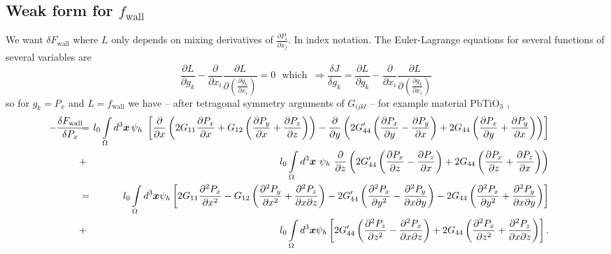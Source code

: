 \documentclass[16pt]{article} %
\begin{document}
\subsection{Weak form for $f_\mathrm{wall}$}
%
We want $\delta F_\mathrm{wall}$ where $L$ only depends on mixing derivatives of $\frac{\partial P_i}{\partial x_j}$.
%
In index notation. The Euler-Lagrange equations for several functions of several variables are
%
$$\frac{\partial L}{\partial g_{k}} - \frac{\partial}{\partial x_i}\frac{\partial L}{\partial \left( \frac{\partial g_k}{\partial x_i}\right)} = 0 \,\,\,\,\mathrm{which}\,\,\, \Rightarrow \frac{\delta J}{\delta g_k} = \frac{\partial L}{\partial g_{k}} - \frac{\partial}{\partial x_i}\frac{\partial L}{\partial \left( \frac{\partial g_k}{\partial x_i}\right)}  $$
%
so for $g_k = P_x$ and $L = f_\mathrm{wall}$ we have -- after tetragonal symmetry arguments of $G_{ijkl}$ -- for example material $\mathrm{PbTiO}_3$ \cite{Li2001}, 
%
\begin{eqnarray}\nonumber
\hspace{-15pt} -\frac{\delta F_\mathrm{wall}}{\delta P_x}\hspace{-5pt} &=&\hspace{-6pt} l_0 \int\limits_\Omega d^3 {\boldsymbol x} \,\psi_h \,\,\left[ \frac{\partial}{\partial x} \left(2 G_{11} \frac{\partial P_x}{\partial x} + G_{12} \left(\frac{\partial P_y}{\partial x} + \frac{\partial P_z}{\partial z} \right) \right) - \frac{\partial}{\partial y} \left(2 G_{44}' \left(\frac{\partial P_x}{\partial y} - \frac{\partial P_y}{\partial x} \right) + 2 G_{44} \left(\frac{\partial P_x}{\partial y} + \frac{\partial P_y}{\partial x} \right) \right) \right]\\ \nonumber
& +& l_0\int\limits_\Omega d^3 {\boldsymbol x} \,\, \psi_h \,\, \frac{\partial}{\partial z} \left( 2 G_{44}' \left(\frac{\partial P_x}{\partial z} - \frac{\partial P_z}{\partial x} \right) + 2 G_{44} \left(\frac{\partial P_x}{\partial z} + \frac{\partial P_z}{\partial x} \right)\right) \\ \nonumber
&=&\hspace{-8pt}  l_0 \int\limits_\Omega d^3 {\boldsymbol x} \psi_h \left[ 2 G_{11} \frac{\partial^2 P_x}{\partial x^2} - G_{12} \left(\frac{\partial^2 P_y}{\partial x^2} + \frac{\partial^2 P_z}{\partial x \partial z} \right) - 2 G'_{44} \left(\frac{\partial^2 P_x}{\partial y^2} - \frac{\partial^2 P_y}{\partial x \partial y}\right) - 2 G_{44} \left( \frac{\partial^2 P_x}{\partial y^2} + \frac{\partial^2 P_y}{\partial x \partial y} \right) \right] \\ \nonumber
&+&l_0 \int\limits_\Omega d^3 {\boldsymbol x} \psi_h \left[2 G_{44}' \left(\frac{\partial^2 P_z}{\partial z^2} - \frac{\partial^2 P_x}{\partial x \partial z} \right) + 2 G_{44} \left(\frac{\partial^2 P_x}{\partial z^2} + \frac{\partial^2 P_z}{\partial x \partial z} \right)\right]. \\ \nonumber
\end{eqnarray}
\end{document}
